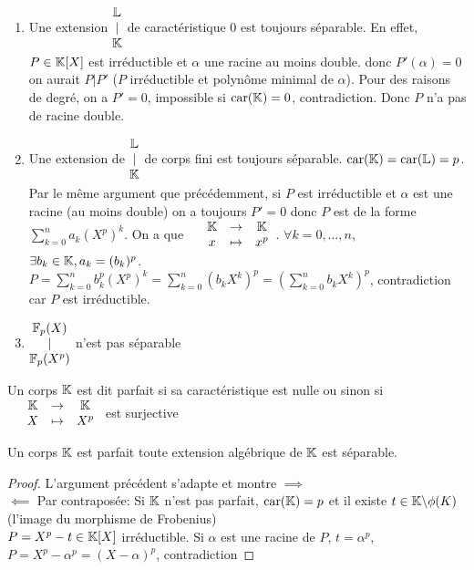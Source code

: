 \documentclass[]{report}
\begin{document}
    \begin{ex}{}{}
        \begin{enumerate}
            \item Une extension $\begin{matrix}
                \mathbb{L}\\
                |\\
                \mathbb{K}
            \end{matrix}$ de caractéristique 0 est toujours séparable. En effet, $P\in \mathbb{K}[X]$ est irréductible et $\alpha$ une racine au moins double. donc $P'(\alpha)=0$ on aurait $P|P'$ ($P$ irréductible et polynôme minimal de $\alpha$). Pour des raisons de degré, on a $P'=0$, impossible si $\text{car}(\mathbb{K})=0$, contradiction. Donc $P$ n'a pas de racine double.
            \item Une extension de $\begin{matrix} \mathbb{L}\\ |\\ \mathbb{K} \end{matrix}$ de corps fini est toujours séparable. $\text{car}(\mathbb{K})=\text{car}(\mathbb{L})=p$. Par le même argument que précédemment, si $P$ est irréductible et $\alpha$ est une racine (au moins double) on a toujours $P'=0$ donc $P$ est de la forme $\sum_{k=0}^{n}a_k (X^p)^k$. On a que $\begin{array}{ccccc} & \mathbb{K} & \to & \mathbb{K} \\ & x & \mapsto & x^p \end{array}$. $\forall k=0,\ldots,n$, $\exists b_k\in \mathbb{K}, a_k=(b_k)^p$.\\
            $P=\sum_{k=0}^{n}b_k^p(X^p)^k=\sum_{k=0}^{n}(b_k X^k)^p=(\sum_{k=0}^{n}b_kX^k)^p$, contradiction car $P$ est irréductible.
            \item $\begin{matrix} \mathbb{F}_p(X)\\ |\\ \mathbb{F}_p(X^p) \end{matrix}$ n'est pas séparable
        \end{enumerate}
    \end{ex}

    \begin{df}{}{}
        Un corps $\mathbb{K}$ est dit parfait si sa caractéristique est nulle ou sinon si $\begin{array}{ccccc} & \mathbb{K} & \to & \mathbb{K} \\ & X & \mapsto & X^p \end{array}$ est surjective
    \end{df}

    \begin{lm}{}{}
        Un corps $\mathbb{K}$ est parfait \ssi toute extension algébrique de $\mathbb{K}$ est séparable.
    \end{lm}

    \begin{proof}
        L'argument précédent s'adapte et montre $\implies$\\
        $\impliedby$ Par contraposée: Si $\mathbb{K}$ n'est pas parfait, $\text{car}(\mathbb{K})=p$ et il existe $t\in \mathbb{K}\backslash\phi(K)$(l'image du morphisme de Frobenius)\\
        $P=X^p-t\in \mathbb{K}[X]$ irréductible. Si $\alpha$ est une racine de $P$, $t=\alpha^p$, $P=X^p-\alpha^p=(X-\alpha)^p$, contradiction
    \end{proof}
\end{document}
